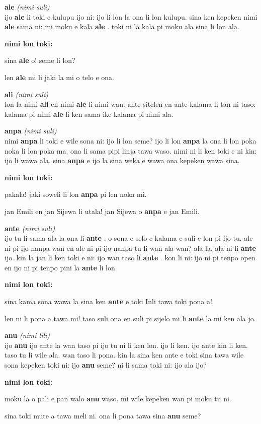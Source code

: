 \documentclass[a4paper,11pt]{book}
\newenvironment{definition}[2]{ %
  \begin{minipage}{\dimexpr\textwidth}
  \begin{description}
  \item
    {\huge \textbf{#1}}
    {\Large \textit{(#2)}} \\
}{
  \end{description}
  \end{minipage}
}
\newenvironment{example}{ %
  \item
  \textbf{nimi lon toki:}

  \hfill
  \begin{minipage}{\dimexpr\textwidth-1cm}
  \begin{itshape}
}
{
  \end{itshape}
  \end{minipage}
}
\newcommand{\inex}[1]{%
  \textbf{#1}%
}
\begin{document}
\begin{definition}{ale}{nimi suli}
  ijo \inex{ale} li toki e kulupu ijo ni: ijo li lon la ona li lon kulupu. sina ken kepeken nimi \inex{ale} sama ni: mi moku e kala \inex{ale}. toki ni la kala pi moku ala sina li lon ala.
  \begin{example}
    sina \inex{ale} o! seme li lon?
    
    len \inex{ale} mi li jaki la mi o telo e ona.
  \end{example}
\end{definition}

\begin{definition}{ali}{nimi suli}
  lon la nimi \inex{ali} en nimi \inex{ale} li nimi wan. ante sitelen en ante kalama li tan ni taso: kalama pi nimi \inex{ale} li ken sama ike kalama pi nimi ala.
\end{definition}

\begin{definition}{anpa}{nimi suli}
  nimi \inex{anpa} li toki e wile sona ni: ijo li lon seme? ijo li lon \inex{anpa} la ona li lon poka noka li lon poka ma. ona li sama pipi linja tawa waso. nimi ni li ken toki e ni kin: ijo li wawa ala. sina \inex{anpa} e ijo la sina weka e wawa ona kepeken wawa sina.
  \begin{example}
    pakala! jaki soweli li lon \inex{anpa} pi len noka mi.
    
    jan Emili en jan Sijewa li utala! jan Sijewa o \inex{anpa} e jan Emili.
  \end{example}
\end{definition}

\begin{definition}{ante}{nimi suli}
  ijo tu li sama ala la ona li \inex{ante}. o sona e selo e kalama e suli e lon pi ijo tu. ale ni pi ijo nanpa wan en ale ni pi ijo nanpa tu li wan ala wan? ala la, ala ni li \inex{ante} ijo. kin la jan li ken toki e ni: ijo wan taso li \inex{ante}. kon li ni: ijo ni pi tenpo open en ijo ni pi tenpo pini la \inex{ante} li lon.
  \begin{example}
    sina kama sona wawa la sina ken \inex{ante} e toki Inli tawa toki pona a!
    
    len ni li pona a tawa mi! taso suli ona en suli pi sijelo mi li \inex{ante} la mi ken ala jo.
  \end{example}
\end{definition}


\begin{definition}{anu}{nimi lili}
  ijo \inex{anu} ijo ante la wan taso pi ijo tu ni li ken lon. ijo li ken. ijo ante kin li ken. taso tu li wile ala. wan taso li pona. kin la sina ken ante e toki sina tawa wile sona kepeken toki ni: ijo \inex{anu} seme? ni li sama toki ni: ijo ala ijo?
  \begin{example}
    moku la o pali e pan walo \inex{anu} waso. mi wile kepeken wan pi moku tu ni.
    
    sina toki mute a tawa meli ni. ona li pona tawa sina \inex{anu} seme?
  \end{example}
\end{definition}
\end{document}
